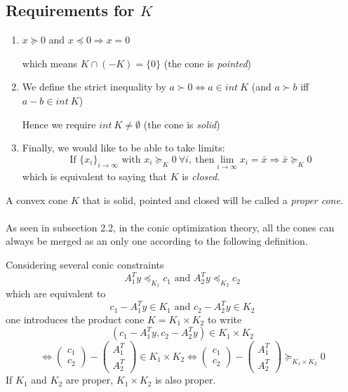 \documentclass[10pt,a4paper]{article}
\begin{document}
\begin{example}
\begin{center}
\end{center}
\end{example}





\noindent \subsection{Requirements for $K$} 
\begin{enumerate}
\item $x \succeq 0$ and $x \preceq 0 \Rightarrow x = 0$

which means $K \cap (-K) = \{ 0 \}$ (the cone is \emph{pointed})

\item We define the strict inequality by $a \succ 0
\Leftrightarrow a \in int ~K$ (and $a \succ b$ iff $a-b \in int~
K$)

Hence we require $int~ K \neq \emptyset$ (the cone is
\emph{solid})

\item Finally, we would like to be able to take limits:
\[ \text{If } \{ x_i \}_{i \to \infty} \text{ with } x_i \succeq_K
0 \ \forall i,\ \text{then} \lim_{i \to \infty} x_i = \bar{x}
\Rightarrow \bar{x} \succeq_K 0 \] which is equivalent to saying
that $K$ is \emph{closed}. \end{enumerate}  

\vspace{0.25cm}

\noindent A convex cone $K$ that is solid, pointed and
closed will be called a \emph{proper cone}. \\ \\



\noindent As seen in subsection 2.2, in the conic optimization theory, all the cones can always be merged as an only one according to the following definition.
\begin{definition} 

\noindent Considering
several conic constraints \[ A_1^T y \preceq_{K_1} c_1
\text{ and } A_2^T y \preceq_{K_2} c_2 \] which are equivalent to
\[ c_1 - A_1^T y \in K_1 \text{ and } c_2 - A_2^T y \in K_2 \] one
introduces the product cone $K = K_1 \times K_2$ to write
\[ (c_1 - A_1^T y, c_2 - A_2^T y) \in K_1 \times K_2
\] \[ \Leftrightarrow \begin{pmatrix} c_1 \\ c_2
\end{pmatrix} -
\begin{pmatrix} A_1^T \\ A_2^T \end{pmatrix} \in K_1 \times K_2
\Leftrightarrow
 \begin{pmatrix} c_1 \\ c_2 \end{pmatrix} -
\begin{pmatrix} A_1^T \\ A_2^T \end{pmatrix} \succeq_{K_1 \times K_2} 0 \]
If $K_1$ and $K_2$ are proper, $K_1 \times K_2$ is also proper.
\end{definition}
\end{document}

